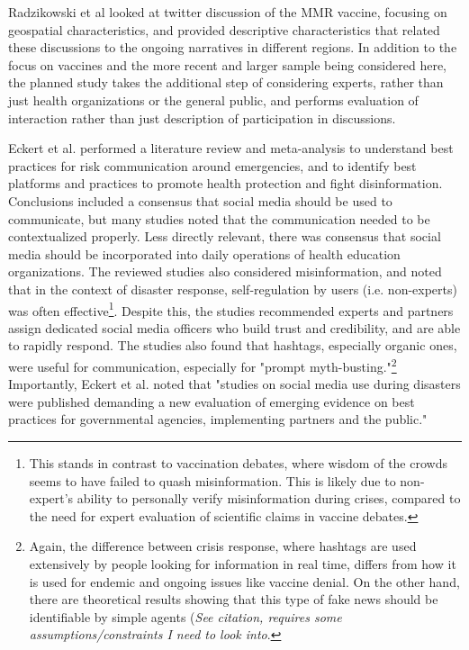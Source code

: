 \documentclass{article}
\begin{document}
Radzikowski et al looked at twitter discussion of the MMR vaccine, focusing on geospatial characteristics, and provided descriptive characteristics that related these discussions to the ongoing narratives in different regions\cite{Radzikowski2016}. In addition to the focus on vaccines and the more recent and larger sample being considered here, the planned study takes the additional step of considering experts, rather than just health organizations or the general public, and performs evaluation of interaction rather than just description of participation in discussions.

Eckert et al. performed a literature review and meta-analysis to understand best practices for risk communication around emergencies, and to identify best platforms and practices to promote health protection and fight disinformation. Conclusions included a consensus that social media should be used to communicate, but many studies noted that the communication needed to be contextualized properly. Less directly relevant, there was consensus that  social media should be incorporated into daily operations of health education organizations. The reviewed studies also considered misinformation, and noted that in the context of disaster response, self-regulation by users (i.e. non-experts) was often effective\footnote{This stands in contrast to vaccination debates, where wisdom of the crowds seems to have failed to quash misinformation. This is likely due to non-expert's ability to personally verify misinformation during crises, compared to the need for expert evaluation of scientific claims in vaccine debates.}. Despite this, the studies recommended experts and partners assign dedicated social media officers who build trust and credibility, and are able to rapidly respond. The studies also found that hashtags, especially organic ones, were useful for communication, especially for "prompt myth-busting."\footnote{Again, the difference between crisis response, where hashtags are used extensively by people looking for information in real time, differs from how it is used for endemic and ongoing issues like vaccine denial. On the other hand, there are theoretical results showing that this type of fake news should be identifiable by simple agents (\textit{See citation, requires some assumptions/constraints I need to look into}\cite{Aymanns2017}.} Importantly, Eckert et al. noted that "studies on social media use during disasters were published demanding a new evaluation of emerging evidence on best practices for governmental agencies, implementing partners and the public." \cite{Eckert2018}
\end{document}
